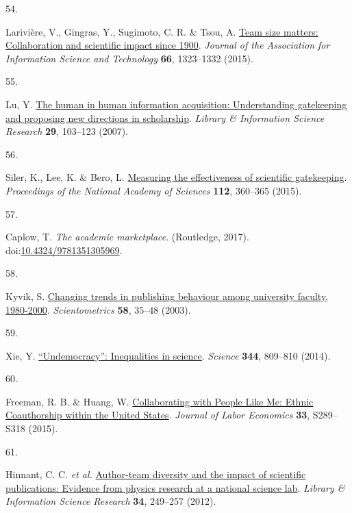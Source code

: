 \documentclass[
  man,floatsintext]{apa6}
\newlength{\cslhangindent}
\newlength{\csllabelwidth}
\newlength{\cslentryspacingunit} %
\newenvironment{CSLReferences}[2] %
 {%
  \setlength{\parindent}{0pt}
  \ifodd #1
  \let\oldpar\par
  \def\par{\hangindent=\cslhangindent\oldpar}
  \fi
  \setlength{\parskip}{#2\cslentryspacingunit}
 }%
 {}
\newcommand{\CSLLeftMargin}[1]{\parbox[t]{\csllabelwidth}{#1}}
\newcommand{\CSLRightInline}[1]{\parbox[t]{\linewidth - \csllabelwidth}{#1}\break}
\begin{document}
\begin{CSLReferences}{0}{0}
\leavevmode{}%
\CSLLeftMargin{54. }%
\CSLRightInline{Larivière, V., Gingras, Y., Sugimoto, C. R. \& Tsou, A. \href{https://doi.org/10.1002/asi.23266}{Team size matters: Collaboration and scientific impact since 1900}. \emph{Journal of the Association for Information Science and Technology} \textbf{66}, 1323--1332 (2015).}

\leavevmode{}%
\CSLLeftMargin{55. }%
\CSLRightInline{Lu, Y. \href{https://doi.org/10.1016/j.lisr.2006.10.007}{The human in human information acquisition: Understanding gatekeeping and proposing new directions in scholarship}. \emph{Library \& Information Science Research} \textbf{29}, 103--123 (2007).}

\leavevmode{}%
\CSLLeftMargin{56. }%
\CSLRightInline{Siler, K., Lee, K. \& Bero, L. \href{https://doi.org/10.1073/pnas.1418218112}{Measuring the effectiveness of scientific gatekeeping}. \emph{Proceedings of the National Academy of Sciences} \textbf{112}, 360--365 (2015).}

\leavevmode{}%
\CSLLeftMargin{57. }%
\CSLRightInline{Caplow, T. \emph{The academic marketplace}. (Routledge, 2017). doi:\href{https://doi.org/10.4324/9781351305969}{10.4324/9781351305969}.}

\leavevmode{}%
\CSLLeftMargin{58. }%
\CSLRightInline{Kyvik, S. \href{https://doi.org/10.1023/A:1025475423482}{Changing trends in publishing behaviour among university faculty, 1980-2000}. \emph{Scientometrics} \textbf{58}, 35--48 (2003).}

\leavevmode{}%
\CSLLeftMargin{59. }%
\CSLRightInline{Xie, Y. \href{https://doi.org/10.1126/science.1252743}{{``}Undemocracy{''}: Inequalities in science}. \emph{Science} \textbf{344}, 809--810 (2014).}

\leavevmode{}%
\CSLLeftMargin{60. }%
\CSLRightInline{Freeman, R. B. \& Huang, W. \href{https://doi.org/10.1086/678973}{Collaborating with People Like Me: Ethnic Coauthorship within the United States}. \emph{Journal of Labor Economics} \textbf{33}, S289--S318 (2015).}

\leavevmode{}%
\CSLLeftMargin{61. }%
\CSLRightInline{Hinnant, C. C. \emph{et al.} \href{https://doi.org/10.1016/j.lisr.2012.03.001}{Author-team diversity and the impact of scientific publications: Evidence from physics research at a national science lab}. \emph{Library \& Information Science Research} \textbf{34}, 249--257 (2012).}


\end{CSLReferences}
\end{document}
